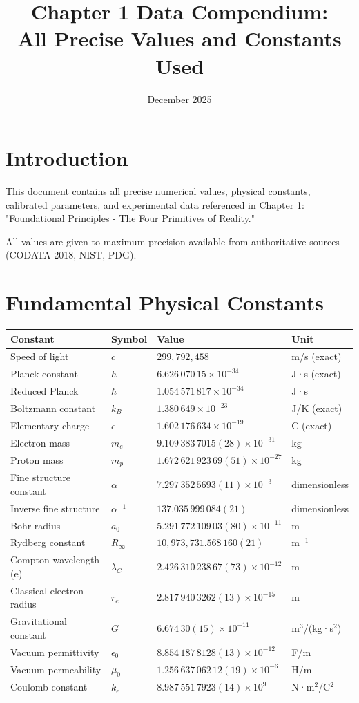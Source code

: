 \documentclass{article}
\title{Chapter 1 Data Compendium:\\All Precise Values and Constants Used}
\date{December 2025}
\begin{document}
\maketitle

\section{Introduction}

This document contains all precise numerical values, physical constants, calibrated parameters, and experimental data referenced in Chapter 1: "Foundational Principles - The Four Primitives of Reality."

All values are given to maximum precision available from authoritative sources (CODATA 2018, NIST, PDG).

\section{Fundamental Physical Constants}

\begin{longtable}{llll}
\toprule
\textbf{Constant} & \textbf{Symbol} & \textbf{Value} & \textbf{Unit} \\
\midrule
Speed of light & $c$ & $299{,}792{,}458$ & m/s (exact) \\
Planck constant & $h$ & $6.626\,070\,15 \times 10^{-34}$ & J·s (exact) \\
Reduced Planck & $\hbar$ & $1.054\,571\,817 \times 10^{-34}$ & J·s \\
Boltzmann constant & $k_B$ & $1.380\,649 \times 10^{-23}$ & J/K (exact) \\
Elementary charge & $e$ & $1.602\,176\,634 \times 10^{-19}$ & C (exact) \\
Electron mass & $m_e$ & $9.109\,383\,7015(28) \times 10^{-31}$ & kg \\
Proton mass & $m_p$ & $1.672\,621\,923\,69(51) \times 10^{-27}$ & kg \\
Fine structure constant & $\alpha$ & $7.297\,352\,5693(11) \times 10^{-3}$ & dimensionless \\
Inverse fine structure & $\alpha^{-1}$ & $137.035\,999\,084(21)$ & dimensionless \\
Bohr radius & $a_0$ & $5.291\,772\,109\,03(80) \times 10^{-11}$ & m \\
Rydberg constant & $R_\infty$ & $10{,}973{,}731.568\,160(21)$ & m$^{-1}$ \\
Compton wavelength (e) & $\lambda_C$ & $2.426\,310\,238\,67(73) \times 10^{-12}$ & m \\
Classical electron radius & $r_e$ & $2.817\,940\,3262(13) \times 10^{-15}$ & m \\
Gravitational constant & $G$ & $6.674\,30(15) \times 10^{-11}$ & m$^3$/(kg·s$^2$) \\
Vacuum permittivity & $\epsilon_0$ & $8.854\,187\,8128(13) \times 10^{-12}$ & F/m \\
Vacuum permeability & $\mu_0$ & $1.256\,637\,062\,12(19) \times 10^{-6}$ & H/m \\
Coulomb constant & $k_e$ & $8.987\,551\,7923(14) \times 10^{9}$ & N·m$^2$/C$^2$ \\
\bottomrule
\end{longtable}
\end{document}
